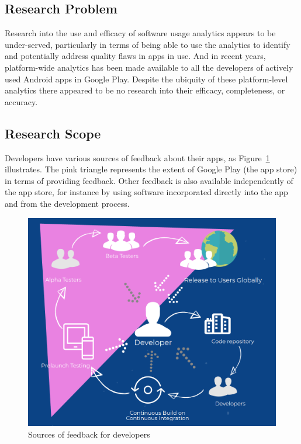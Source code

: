 \subsection{Research Problem}
Research into the use and efficacy of software usage analytics appears to be under-served, particularly in terms of being able to use the analytics to identify and potentially address quality flaws in apps in use. And in recent years, platform-wide analytics has been made available to all the developers of actively used Android apps in Google Play. Despite the ubiquity of these platform-level analytics there appeared to be no research into their efficacy, completeness, or accuracy.




\subsection{Research Scope}
Developers have various sources of feedback about their apps, as Figure~\ref{fig:sources-of-feedback-for-developers} illustrates. The pink triangle represents the extent of Google Play (the app store) in terms of providing feedback. Other feedback is also available independently of the app store, for instance by using software incorporated directly into the app and from the development process.

\begin{figure}[htbp!]
    \centering
    \includegraphics[width=13cm]{images/silvias-developer-centric-figure-mobilesoft2020.png}
    \caption{Sources of feedback for developers}
    \label{fig:sources-of-feedback-for-developers}
\end{figure}

